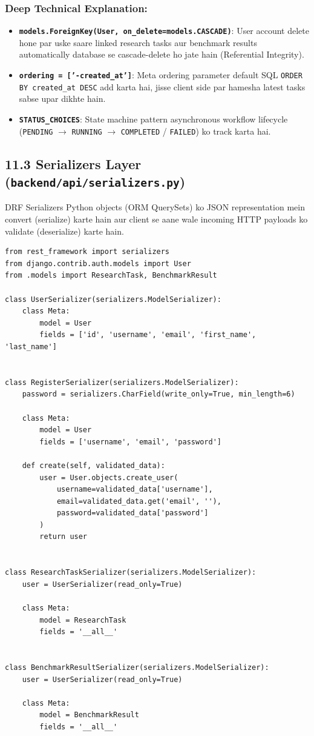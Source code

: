 \documentclass[12pt, a4paper]{article}
\begin{document}
\subsubsection{Deep Technical Explanation:}
\begin{itemize}
    \item \textbf{\texttt{models.ForeignKey(User, on\_delete=models.CASCADE)}}: User account delete hone par uske saare linked research tasks aur benchmark results automatically database se cascade-delete ho jate hain (Referential Integrity).
    \item \textbf{\texttt{ordering = ['-created\_at']}}: Meta ordering parameter default SQL \texttt{ORDER BY created\_at DESC} add karta hai, jisse client side par hamesha latest tasks sabse upar dikhte hain.
    \item \textbf{\texttt{STATUS\_CHOICES}}: State machine pattern asynchronous workflow lifecycle (\texttt{PENDING} $\rightarrow$ \texttt{RUNNING} $\rightarrow$ \texttt{COMPLETED} / \texttt{FAILED}) ko track karta hai.
\end{itemize}

\clearpage
\subsection{11.3 Serializers Layer (\texttt{backend/api/serializers.py})}

DRF Serializers Python objects (ORM QuerySets) ko JSON representation mein convert (serialize) karte hain aur client se aane wale incoming HTTP payloads ko validate (deserialize) karte hain.

\begin{lstlisting}[style=pythonstyle, caption={backend/api/serializers.py --- DRF Data Serializers}]
from rest_framework import serializers
from django.contrib.auth.models import User
from .models import ResearchTask, BenchmarkResult

class UserSerializer(serializers.ModelSerializer):
    class Meta:
        model = User
        fields = ['id', 'username', 'email', 'first_name', 'last_name']


class RegisterSerializer(serializers.ModelSerializer):
    password = serializers.CharField(write_only=True, min_length=6)

    class Meta:
        model = User
        fields = ['username', 'email', 'password']

    def create(self, validated_data):
        user = User.objects.create_user(
            username=validated_data['username'],
            email=validated_data.get('email', ''),
            password=validated_data['password']
        )
        return user


class ResearchTaskSerializer(serializers.ModelSerializer):
    user = UserSerializer(read_only=True)

    class Meta:
        model = ResearchTask
        fields = '__all__'


class BenchmarkResultSerializer(serializers.ModelSerializer):
    user = UserSerializer(read_only=True)

    class Meta:
        model = BenchmarkResult
        fields = '__all__'
\end{lstlisting}
\end{document}
